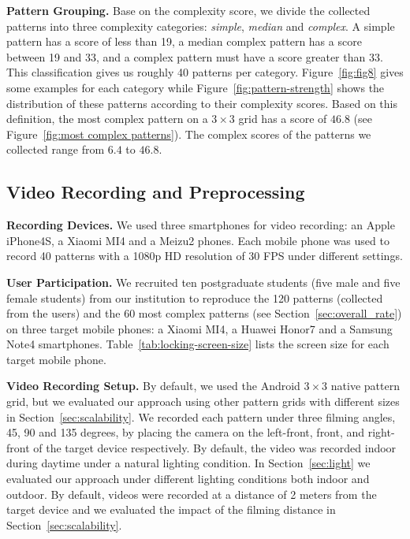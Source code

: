     \vspace{2mm}
    \noindent \textbf{Pattern Grouping.}
    Base on the complexity score, we divide the collected patterns into three complexity categories: \emph{simple}, \emph{median} and \emph{complex}. A simple pattern has a score of less than 19,
    a median
    complex pattern has a score between 19 and 33, and a complex pattern must have a score greater than 33. This classification gives us roughly 40 patterns per
    category. Figure~\ref{fig:fig8} gives some examples for each category while Figure~\ref{fig:pattern-strength} shows the distribution of these patterns according to their complexity scores.
    Based on this definition, the most complex pattern on a $3 \times 3$ grid has a score of $46.8$ (see Figure~\ref{fig:most complex patterns}).  The complex scores of the patterns we collected range from $6.4$ to $46.8$.


    \subsection{Video Recording and Preprocessing}
    \noindent\textbf{Recording Devices.} We used three smartphones for video recording: an Apple iPhone4S,
     a Xiaomi MI4 and a Meizu2 phones. Each mobile phone was used to record 40 patterns with a
    1080p HD resolution of 30 FPS under different settings.

    \vspace{2mm}
    \noindent\textbf{User Participation.} We recruited ten postgraduate students (five male and five female
    students) from our institution to reproduce the 120 patterns (collected from the users)
    and the 60 most complex patterns (see Section~\ref{sec:overall_rate})  on three target mobile phones:
    a Xiaomi MI4, a Huawei Honor7 and a Samsung Note4 smartphones. Table~\ref{tab:locking-screen-size} lists
    the screen size for each target mobile phone.

    \vspace{2mm}
   \noindent\textbf{Video Recording Setup.}
    By default, we used the  Android $3 \times 3$ native pattern grid,
    but we evaluated our approach using other pattern grids with different sizes in
    Section~\ref{sec:scalability}. We recorded each pattern under three filming
    angles, 45, 90 and 135 degrees, by placing the camera on the left-front, front, and right-front
    of the target device respectively.
    By default, the video
    was recorded indoor during daytime under a natural lighting condition. In
    Section~\ref{sec:light} we evaluated our approach under different lighting conditions
    both indoor and outdoor. By default, videos were recorded at a distance of
    2 meters from the target device and we evaluated the impact of the filming distance in
    Section~\ref{sec:scalability}.

